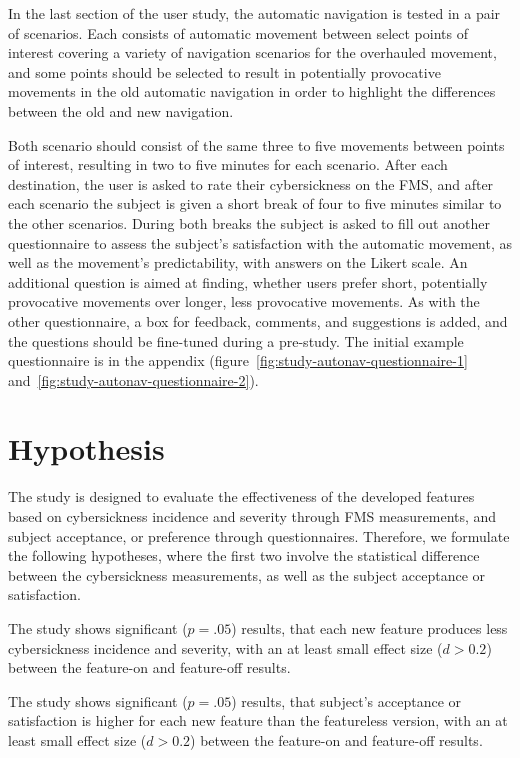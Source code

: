 In the last section of the user study, the automatic navigation is tested in a pair of scenarios.
Each consists of automatic movement between select points of interest covering a variety of navigation scenarios for
the overhauled movement, and some points should be selected to result in potentially provocative movements in the old
automatic navigation in order to highlight the differences between the old and new navigation.

Both scenario should consist of the same three to five movements between points of interest, resulting in two to five
minutes for each scenario.
After each destination, the user is asked to rate their cybersickness on the FMS, and after each scenario the subject is
given a short break of four to five minutes similar to the other scenarios.
During both breaks the subject is asked to fill out another questionnaire to assess the subject's satisfaction with
the automatic movement, as well as the movement's predictability, with answers on the Likert scale.
An additional question is aimed at finding, whether users prefer short, potentially provocative movements over longer,
less provocative movements.
As with the other questionnaire, a box for feedback, comments, and suggestions is added, and the questions should be
fine-tuned during a pre-study.
The initial example questionnaire is in the appendix (figure~\ref{fig:study-autonav-questionnaire-1}
and~\ref{fig:study-autonav-questionnaire-2}).


\section{Hypothesis}\label{sec:hypothesis}

The study is designed to evaluate the effectiveness of the developed features based on cybersickness incidence and
severity through FMS measurements, and subject acceptance, or preference through questionnaires.
Therefore, we formulate the following hypotheses, where the first two involve the statistical difference between
the cybersickness measurements, as well as the subject acceptance or satisfaction.
\begin{hypothesis}
    \label{hyp:cybersickness}
    The study shows significant ($p = .05$) results, that each new feature produces less cybersickness incidence and
    severity, with an at least small effect size ($d > 0.2$) between the feature-on and feature-off results.
\end{hypothesis}
\begin{hypothesis}
    \label{hyp:satisfaction}
    The study shows significant ($p = .05$) results, that subject's acceptance or satisfaction is higher for each new
    feature than the featureless version, with an at least small effect size ($d > 0.2$) between the feature-on and
    feature-off results.
\end{hypothesis}

